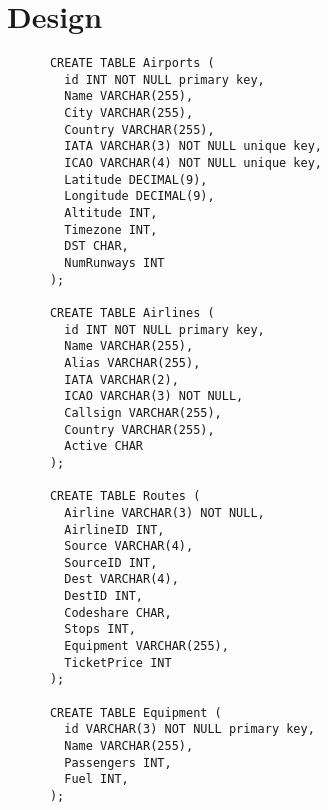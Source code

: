 \documentclass[12pt]{article}
\begin{document}
  \section{Design}
    \begin{verbatim}
      CREATE TABLE Airports (
        id INT NOT NULL primary key,
        Name VARCHAR(255),
        City VARCHAR(255),
        Country VARCHAR(255),
        IATA VARCHAR(3) NOT NULL unique key,
        ICAO VARCHAR(4) NOT NULL unique key,
        Latitude DECIMAL(9),
        Longitude DECIMAL(9),
        Altitude INT,
        Timezone INT,
        DST CHAR,
        NumRunways INT
      );
      
      CREATE TABLE Airlines (
        id INT NOT NULL primary key,
        Name VARCHAR(255),
        Alias VARCHAR(255),
        IATA VARCHAR(2),
        ICAO VARCHAR(3) NOT NULL,
        Callsign VARCHAR(255),
        Country VARCHAR(255),
        Active CHAR
      );
      
      CREATE TABLE Routes (
        Airline VARCHAR(3) NOT NULL,
        AirlineID INT,
        Source VARCHAR(4),
        SourceID INT,
        Dest VARCHAR(4),
        DestID INT,
        Codeshare CHAR,
        Stops INT,
        Equipment VARCHAR(255),
        TicketPrice INT
      );
      
      CREATE TABLE Equipment (
        id VARCHAR(3) NOT NULL primary key,
        Name VARCHAR(255),
        Passengers INT,
        Fuel INT,
      );
    \end{verbatim}
\end{document}
